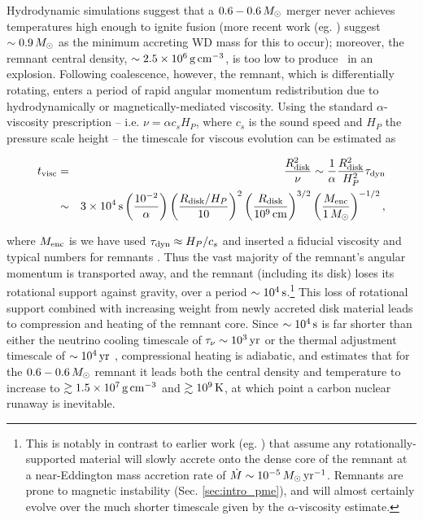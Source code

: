 Hydrodynamic simulations \citep{loreig09} suggest that a $0.6-0.6\,\Msun$ merger never achieves temperatures high enough to ignite fusion (more recent work (eg. \citep{pakm+11, dan+12}) suggest $\sim0.9\,\Msun$ as the minimum accreting WD mass for this to occur); moreover, the remnant central density, $\sim2.5\times10^6\,\gcc$, is too low to produce \Ni\ in an explosion.  Following coalescence, however, the remnant, which is differentially rotating, enters a period of rapid angular momentum redistribution due to hydrodynamically or magnetically-mediated viscosity.  Using the standard $\alpha$-viscosity prescription \cite{shaks73} -- i.e. $\nu = \alpha c_s H_P$, where $c_s$ is the sound speed and $H_P$ the pressure scale height -- the timescale for viscous evolution can be estimated as

\begin{eqnarray}
t_\mrm{visc} &=& \frac{R_\mrm{disk}^2}{\nu} \sim \frac{1}{\alpha}\frac{R_\mrm{disk}^2}{H_P^2}\taudyn \nonumber \\
			&\sim& 3\times10^4\,\mrm{s}\left(\frac{10^{-2}}{\alpha}\right)\left(\frac{R_\mrm{disk}/H_P}{10}\right)^2\left(\frac{R_\mrm{disk}}{10^9\,\mrm{cm}}\right)^{3/2}\left(\frac{M_\mrm{enc}}{1\,\Msun}\right)^{-1/2},
\end{eqnarray}

\noindent where $M_\mathrm{enc}$ is we have used $\taudyn \approx H_P/c_s$ and inserted a fiducial viscosity and typical numbers for remnants \citep{shen+12}.  Thus the vast majority of the remnant's angular momentum is transported away, and the remnant (including its disk) loses its rotational support against gravity, over a period $\sim10^4\,\mathrm{s}$.\footnote{This is notably in contrast to earlier work (eg. \citep{nomoi85, yoonpr07}) that assume any rotationally-supported material will slowly accrete onto the dense core of the remnant at a near-Eddington mass accretion rate of $\dot{M} \sim 10^{-5}\,\Msun\,\pyr$.  Remnants are prone to magnetic instability (Sec. \ref{sec:intro_pme}), and will almost certainly evolve over the much shorter timescale given by the $\alpha$-viscosity estimate.}  This loss of rotational support combined with increasing weight from newly accreted disk material leads to compression and heating of the remnant core.  Since $\sim10^4\,\mathrm{s}$ is far shorter than either the neutrino cooling timescale of $\taunu \sim 10^3\,\mrm{yr}$ or the thermal adjustment timescale of $\sim10^4\,\mathrm{yr}$ \citep{shen+12}, compressional heating is adiabatic, and \citeal{vkercj10} estimates that for the $0.6-0.6\,\Msun$ remnant it leads both the central density and temperature to increase to $\gtrsim1.5\times10^7\,\gcc$ and $\gtrsim10^9\,\mathrm{K}$, at which point a carbon nuclear runaway is inevitable.

